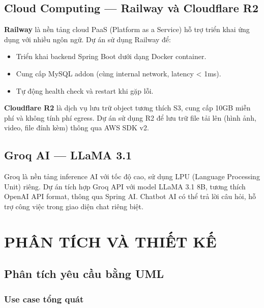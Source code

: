 \documentclass[12pt,a4paper]{report}
\begin{document}
\section{Cloud Computing --- Railway và Cloudflare R2}

\textbf{Railway} là nền tảng cloud PaaS (Platform as a Service) hỗ trợ triển khai ứng dụng với nhiều ngôn ngữ. Dự án sử dụng Railway để:

\begin{itemize}
    \item Triển khai backend Spring Boot dưới dạng Docker container.
    \item Cung cấp MySQL addon (cùng internal network, latency < 1ms).
    \item Tự động health check và restart khi gặp lỗi.
\end{itemize}

\textbf{Cloudflare R2} là dịch vụ lưu trữ object tương thích S3, cung cấp 10GB miễn phí và không tính phí egress. Dự án sử dụng R2 để lưu trữ file tải lên (hình ảnh, video, file đính kèm) thông qua AWS SDK v2.

\section{Groq AI --- LLaMA 3.1}

Groq là nền tảng inference AI với tốc độ cao, sử dụng LPU (Language Processing Unit) riêng. Dự án tích hợp Groq API với model LLaMA 3.1 8B, tương thích OpenAI API format, thông qua Spring AI. Chatbot AI có thể trả lời câu hỏi, hỗ trợ công việc trong giao diện chat riêng biệt.

\chapter{PHÂN TÍCH VÀ THIẾT KẾ}

\section{Phân tích yêu cầu bằng UML}

\subsection{Use case tổng quát}
\end{document}
